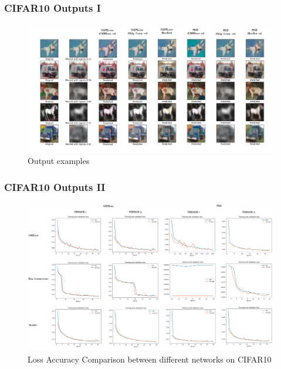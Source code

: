 \documentclass [handout] {beamer}
\begin{document}
\begin{frame}
	\frametitle{CIFAR10 Outputs I}
	\begin{figure}[hptb]
	\centering
	\includegraphics[scale=0.19]{Outputs_comparison.png}
	\caption{Output examples}
	\label{CIFAR10Output}
	\end{figure}
\end{frame}

\begin{frame}
	\frametitle{CIFAR10 Outputs II}
	\begin{figure}[hptb]
	\includegraphics[scale=0.14]{Loss_accuracy_comparison.png}
	\caption{Loss Accuracy Comparison between different networks on CIFAR10}
	\label{CIFAR10Loss}
	\end{figure}
\end{frame}
\end{document}
